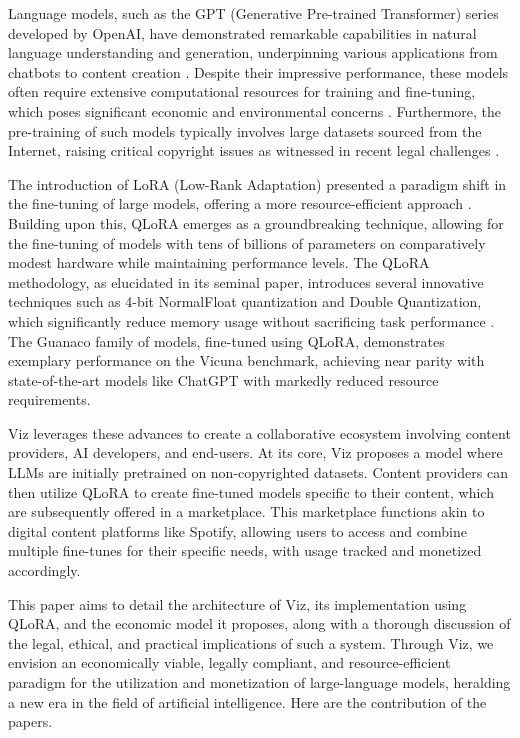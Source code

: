 \documentclass{article}
\begin{document}
Language models, such as the GPT (Generative Pre-trained Transformer) series developed by OpenAI, have demonstrated remarkable capabilities in natural language understanding and generation, underpinning various applications from chatbots to content creation \citep{Radford2019LanguageMA}\citep{brown2020language}. Despite their impressive performance, these models often require extensive computational resources for training and fine-tuning, which poses significant economic and environmental concerns \citep{strubell-etal-2019-energy}. Furthermore, the pre-training of such models typically involves large datasets sourced from the Internet, raising critical copyright issues as witnessed in recent legal challenges \citep{GaonAviv2021Tfoc}.

The introduction of LoRA (Low-Rank Adaptation) presented a paradigm shift in the fine-tuning of large models, offering a more resource-efficient approach \citep{hu2021lora}. Building upon this, QLoRA emerges as a groundbreaking technique, allowing for the fine-tuning of models with tens of billions of parameters on comparatively modest hardware while maintaining performance levels. The QLoRA methodology, as elucidated in its seminal paper, introduces several innovative techniques such as 4-bit NormalFloat quantization and Double Quantization, which significantly reduce memory usage without sacrificing task performance \citep{dettmers2023qlora}. The Guanaco family of models, fine-tuned using QLoRA, demonstrates exemplary performance on the Vicuna benchmark, achieving near parity with state-of-the-art models like ChatGPT with markedly reduced resource requirements.

Viz leverages these advances to create a collaborative ecosystem involving content providers, AI developers, and end-users. At its core, Viz proposes a model where LLMs are initially pretrained on non-copyrighted datasets. Content providers can then utilize QLoRA to create fine-tuned models specific to their content, which are subsequently offered in a marketplace. This marketplace functions akin to digital content platforms like Spotify, allowing users to access and combine multiple fine-tunes for their specific needs, with usage tracked and monetized accordingly.

This paper aims to detail the architecture of Viz, its implementation using QLoRA, and the economic model it proposes, along with a thorough discussion of the legal, ethical, and practical implications of such a system. Through Viz, we envision an economically viable, legally compliant, and resource-efficient paradigm for the utilization and monetization of large-language models, heralding a new era in the field of artificial intelligence. Here are the contribution of the papers.
\end{document}
